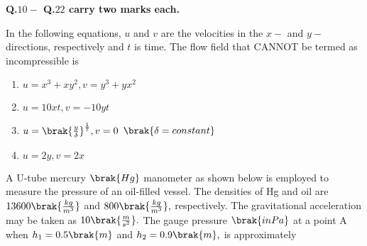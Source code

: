     \textbf{Q.$10-$ Q.$22$ carry two marks each.}\\
    \item In the following equations, $u$ and $v$ are the velocities in the $x-$ and $y-$ directions, respectively and $t$ is time. The flow field that CANNOT be termed as incompressible is
    \begin{enumerate}
        \item $u=x^3+xy^2,v=y^3+yx^2$
        \item $u=10xt,v=-10yt$
        \item $u=\brak{\frac{y}{\delta}}^\frac{1}{7},v=0$ $\brak{\delta=constant}$
        \item $u=2y,v=2x$
    \end{enumerate}
    \item A U-tube mercury $\brak{Hg}$ manometer as shown below is employed to measure the pressure of an oil-filled vessel. The densities of Hg and oil are $13600\brak{\frac{kg}{m^3}}$ and $800\brak{\frac{kg}{m^3}},$ respectively. The gravitational acceleration may be taken as $10\brak{\frac{m}{s^2}}.$ The gauge pressure $\brak{in Pa}$ at a point A when $h_1=0.5\brak{m}$ and $h_2=0.9\brak{m},$ is approximately

